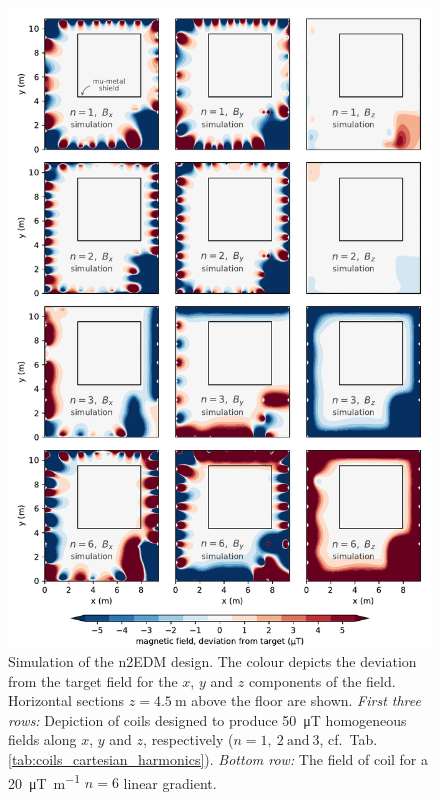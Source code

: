 \begin{figure}
  \centering
  \includegraphics[width=\linewidth]{gfx/prototype/n2EDM_simulation2.pdf}
  \caption{Simulation of the n2EDM design.
  The colour depicts the deviation from the target field for the $x$, $y$ and $z$ components of the field.
  Horizontal sections $z=\SI{4.5}{\meter}$ above the floor are shown.
  \emph{First three rows:} Depiction of coils designed to produce \SI{50}{\micro\tesla} homogeneous fields along $x$, $y$ and $z$, respectively ($n = 1,\ 2\ \text{and}\ 3$, cf.\ Tab.\,\ref{tab:coils_cartesian_harmonics}).
  \emph{Bottom row:} The field of coil for a \SI[per-mode=symbol]{20}{\micro\tesla\per\meter} $n=6$ linear gradient.}\label{fig:n2EDM_design_fields}
\end{figure}

